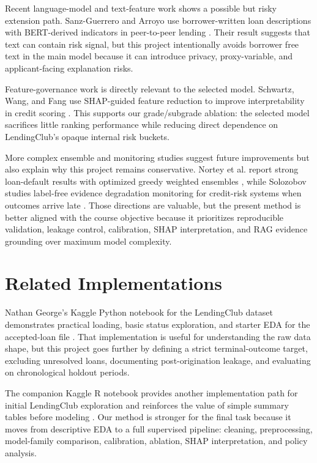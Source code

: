 \documentclass[11pt]{article}
\begin{document}
Recent language-model and text-feature work shows a possible but risky extension path. Sanz-Guerrero and Arroyo use borrower-written loan descriptions with BERT-derived indicators in peer-to-peer lending \cite{sanz2024}. Their result suggests that text can contain risk signal, but this project intentionally avoids borrower free text in the main model because it can introduce privacy, proxy-variable, and applicant-facing explanation risks.

Feature-governance work is directly relevant to the selected model. Schwartz, Wang, and Fang use SHAP-guided feature reduction to improve interpretability in credit scoring \cite{schwartz2025}. This supports our grade/subgrade ablation: the selected model sacrifices little ranking performance while reducing direct dependence on LendingClub's opaque internal risk buckets.

More complex ensemble and monitoring studies suggest future improvements but also explain why this project remains conservative. Nortey et al. report strong loan-default results with optimized greedy weighted ensembles \cite{nortey2026}, while Solozobov studies label-free evidence degradation monitoring for credit-risk systems when outcomes arrive late \cite{solozobov2026}. Those directions are valuable, but the present method is better aligned with the course objective because it prioritizes reproducible validation, leakage control, calibration, SHAP interpretation, and RAG evidence grounding over maximum model complexity.

\section{Related Implementations}
Nathan George's Kaggle Python notebook for the LendingClub dataset demonstrates practical loading, basic status exploration, and starter EDA for the accepted-loan file \cite{kagglepython}. That implementation is useful for understanding the raw data shape, but this project goes further by defining a strict terminal-outcome target, excluding unresolved loans, documenting post-origination leakage, and evaluating on chronological holdout periods.

The companion Kaggle R notebook provides another implementation path for initial LendingClub exploration and reinforces the value of simple summary tables before modeling \cite{kaggler}. Our method is stronger for the final task because it moves from descriptive EDA to a full supervised pipeline: cleaning, preprocessing, model-family comparison, calibration, ablation, SHAP interpretation, and policy analysis.
\end{document}
